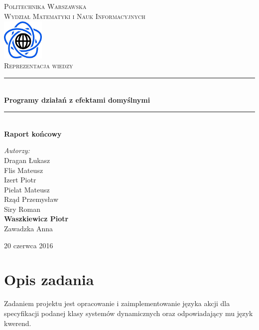 \documentclass{article}
\begin{document}
\begin{titlepage}
\newcommand{\HRule}{\rule{\linewidth}{0.5mm}}
\newcommand{\Action}[1]{\textsc{#1}}
\center
\textsc{\LARGE Politechnika Warszawska}\\[0.3cm]
\textsc{\Large Wydział Matematyki i Nauk Informacyjnych}\\[0.6cm]
\includegraphics[width=2cm, height=2cm]{logo}\\[0.6cm]
\textsc{\Huge Reprezentacja wiedzy}\\[0.3cm]
\HRule \\[0.4cm]
{ \LARGE \bfseries Programy działań z efektami domyślnymi}\\[0.1cm]
 
\HRule \\[0.4cm]
{  \bfseries Raport końcowy}\\[1.2cm]
\begin{flushright}
\Large \emph{Autorzy:}\\[0.5cm]
Dragan Łukasz\\
Flis Mateusz\\
Izert Piotr\\
Pielat Mateusz\\
Rząd Przemysław\\
Siry Roman\\
\textbf{Waszkiewicz Piotr}\\
Zawadzka Anna\\[0.9cm]
\end{flushright}
\vfill
{\large 20 czerwca 2016}\\[1cm]
\end{titlepage}
\newpage

\tableofcontents
\newpage

\section{Opis zadania}

Zadaniem projektu jest opracowanie i zaimplementowanie języka akcji dla specyfikacji podanej klasy systemów dynamicznych oraz odpowiadający mu język kwerend.\\
\end{document}
